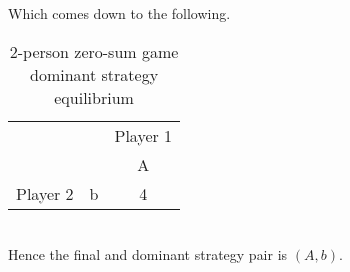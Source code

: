 \documentclass[10pt, a4paper]{report}
\begin{document}
\\\\
Which comes down to the following.
\begin{table}[ht!]
	\hspace{-4em}
	\centering
	\begin{tabular}{ccc|}
		& & \multicolumn{1}{c}{Player 1}       \\ \cline{3-3}
		& & \multicolumn{1}{c}{A}              \\ \cline{3-3}
		Player 2 & \multicolumn{1}{|c|}{b} & 4 \\ \cline{3-3}
	\end{tabular}
	\caption{2-person zero-sum game\\ dominant strategy equilibrium}
\end{table}
\\
Hence the final and dominant strategy pair is $(A,b)$.

\end{document}
